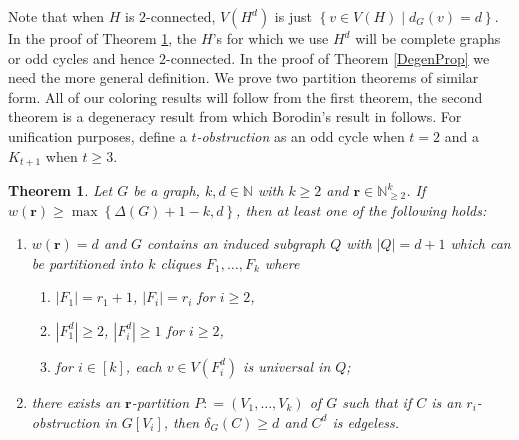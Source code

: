 \documentclass[12pt]{amsart}
\theoremstyle{plain}
\newtheorem{thm}{Theorem}[section]
\theoremstyle{definition}
\theoremstyle{remark}
\newcommand{\IN}{\mathbb{N}}
\newcommand{\set}[1]{\left\{ #1 \right\}}
\newcommand{\setb}[3]{\left\{ #1 \in #2 \mid #3 \right\}}
\newcommand{\card}[1]{\left|#1\right|}
\newcommand{\irange}[1]{\left[#1\right]}
\newcommand{\parens}[1]{\left( #1 \right)}
\newcommand{\DefinedAs}{\mathrel{\mathop:}=}
\newcommand{\mov}[2]{#1^{#2}}
\newcommand{\wt}[1]{w\parens{#1}}
\renewcommand{\vec}[1]{\mathbf{#1}}
\begin{document}
Note that when $H$ is $2$-connected, $V(\mov{H}{d})$ is just $\setb{v}{V(H)}{d_G(v) = d}$.  In the proof of Theorem \ref{PartitionTheorem}, the $H$'s for which we use $H^d$ will be complete graphs or odd cycles and hence $2$-connected.  In the proof of Theorem \ref{DegenProp} we need the more general definition. We prove two partition theorems of similar form.  All of our coloring results will follow from the first theorem, the second theorem is a degeneracy result from which Borodin's result in \cite{borodin1976decomposition} follows.  
For unification purposes, define a \emph{$t$-obstruction} as an odd cycle when
$t=2$ and a $K_{t + 1}$ when $t \geq 3$.

      \begin{thm}\label{PartitionTheorem}
			Let $G$ be a graph, $k,d \in \IN$ with $k \geq 2$ and $\vec{r} \in \IN_{\geq 2}^k$.  If $\wt{\vec{r}} \geq \max\set{\Delta(G) + 1 - k, d}$, then at least one of the following holds:
			\begin{enumerate}
			  \item $\wt{\vec{r}} = d$ and $G$ contains an induced subgraph $Q$ with $\card{Q} = d+1$ which can be partitioned into $k$ cliques $F_1, \ldots, F_k$ where 
					\begin{enumerate}
					\item $\card{F_1} = r_1 + 1$, $\card{F_i} = r_i$ for $i \geq 2$,
					\item $\card{F_1^d} \geq 2$, $\card{F_i^d} \geq 1$ for $i \geq 2$,
					\item for $i \in \irange{k}$, each $v \in V(F_i^d)$ is universal in $Q$;
					\end{enumerate}
			  \item there exists an $\vec{r}$-partition $P \DefinedAs \parens{V_1, \ldots, V_k}$ of 	
$G$ such that if $C$ is an $r_i$-obstruction in $G[V_i]$, then $\delta_G(C) \geq d$ and
			  $\mov{C}{d}$ is edgeless.
			\end{enumerate}
		\end{thm}
\end{document}
